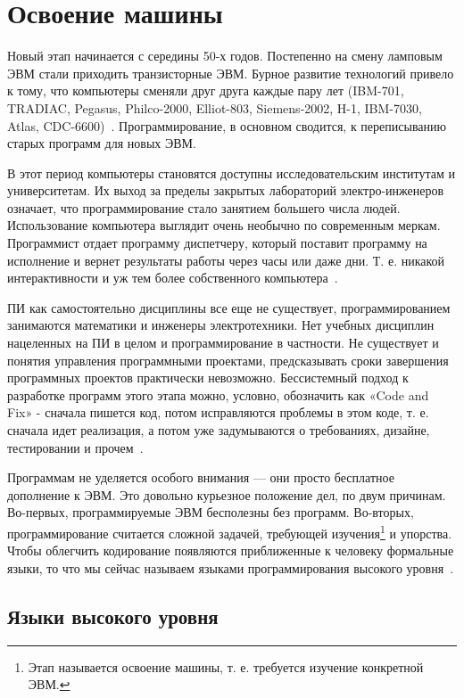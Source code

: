 \section{Освоение машины}

Новый этап начинается с середины 50-х годов. Постепенно на смену ламповым ЭВМ стали приходить транзисторные ЭВМ. Бурное развитие технологий привело к тому, что компьютеры сменяли друг друга каждые пару лет (IBM-701, TRADIAC, Pegasus, Philco-2000, Elliot-803, Siemens-2002, H-1, IBM-7030, Atlas, CDC-6600)~\cite{Glass}. Программирование, в основном сводится, к переписыванию старых программ для новых ЭВМ.

В этот период компьютеры становятся доступны исследовательским институтам и университетам. Их выход за пределы закрытых лабораторий электро-инженеров означает, что программирование стало занятием большего числа людей. Использование компьютера выглядит очень необычно по современным меркам. Программист отдает программу диспетчеру, который поставит программу на исполнение и вернет результаты работы через часы или даже дни. Т. е. никакой интерактивности и уж тем более собственного компьютера~\cite{Wirth:2008:HIST}.

ПИ как самостоятельно дисциплины все еще не существует, программированием занимаются математики и инженеры электротехники. Нет учебных дисциплин нацеленных на ПИ в целом и программирование в частности. Не существует и понятия управления программными проектами, предсказывать сроки завершения программных проектов практически невозможно. Бессистемный подход к разработке программ этого этапа можно, условно, обозначить как «Code and Fix» - сначала пишется код, потом исправляются проблемы в этом коде, т. е. сначала идет реализация, а потом уже задумываются о требованиях, дизайне, тестировании и прочем~\cite{Boehm:1988:SMSD}.

Программам не уделяется особого внимания — они просто бесплатное дополнение к ЭВМ. Это довольно курьезное положение дел, по двум причинам. Во-первых, программируемые ЭВМ бесполезны без программ. Во-вторых, программирование считается сложной задачей, требующей изучения\footnote{Этап называется освоение машины, т. е. требуется изучение конкретной ЭВМ.} и упорства. Чтобы облегчить кодирование появляются приближенные к человеку формальные языки, то что мы сейчас называем языками программирования высокого уровня~\cite{Wirth:2008:HIST}.

\subsection{Языки высокого уровня}

